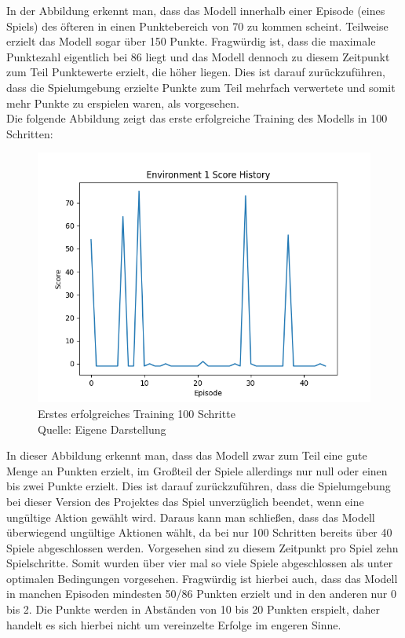 In der Abbildung erkennt man, dass das Modell innerhalb einer Episode (eines Spiels) des öfteren in einen Punktebereich von 70 zu kommen scheint. Teilweise erzielt das Modell sogar über 150 Punkte. Fragwürdig ist, dass die maximale Punktezahl eigentlich bei 86 liegt und das Modell dennoch zu diesem Zeitpunkt zum Teil Punktewerte erzielt, die höher liegen. Dies ist darauf zurückzuführen, dass die Spielumgebung erzielte Punkte zum Teil mehrfach verwertete und somit mehr Punkte zu erspielen waren, als vorgesehen.\\

Die folgende Abbildung zeigt das erste erfolgreiche Training des Modells in 100 Schritten:
\nopagebreak
\begin{figure}[H]
	\includegraphics[width=1\textwidth]{Bilder/firstpropertraining100steps} 
	\caption[Erstes erfolgreiches Training 100 Schritte]{Erstes erfolgreiches Training 100 Schritte\\ Quelle: Eigene Darstellung}
\end{figure}

In dieser Abbildung erkennt man, dass das Modell zwar zum Teil eine gute Menge an Punkten erzielt, im Großteil der Spiele allerdings nur null oder einen bis zwei Punkte erzielt. Dies ist darauf zurückzuführen, dass die Spielumgebung bei dieser Version des Projektes das Spiel unverzüglich beendet, wenn eine ungültige Aktion gewählt wird. Daraus kann man schließen, dass das Modell überwiegend ungültige Aktionen wählt, da bei nur 100 Schritten bereits über 40 Spiele abgeschlossen werden. Vorgesehen sind zu diesem Zeitpunkt pro Spiel zehn Spielschritte. Somit wurden über vier mal so viele Spiele abgeschlossen als unter optimalen Bedingungen vorgesehen. Fragwürdig ist hierbei auch, dass das Modell in manchen Episoden mindesten 50/86 Punkten erzielt und in den anderen nur 0 bis 2. Die Punkte werden in Abständen von 10 bis 20 Punkten erspielt, daher handelt es sich hierbei nicht um vereinzelte Erfolge im engeren Sinne.
